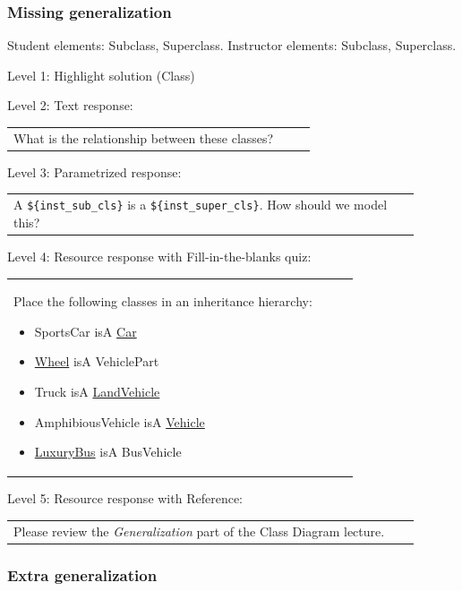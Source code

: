 \subsubsection{Missing generalization}

Student elements: Subclass, Superclass. Instructor elements: Subclass, Superclass. \medskip

\noindent Level 1: Highlight solution (Class) \medskip

\noindent Level 2: Text response: \medskip

\begin{tabular}{|p{0.9\linewidth}}
What is the relationship between these classes?
\end{tabular} \medskip

\noindent Level 3: Parametrized response: \medskip

\begin{tabular}{|p{0.9\linewidth}}
A \verb|${inst_sub_cls}| is a \verb|${inst_super_cls}|. How should we model this?
\end{tabular} \medskip

\noindent Level 4: Resource response with Fill-in-the-blanks quiz: \medskip

\begin{tabular}{|p{0.9\linewidth}}

Place the following classes in an inheritance hierarchy:

\begin{itemize}
    \item SportsCar isA \underline{Car}
    \item \underline{Wheel} isA VehiclePart
    \item Truck isA \underline{LandVehicle}
    \item AmphibiousVehicle isA \underline{Vehicle}
    \item \underline{LuxuryBus} isA BusVehicle
\end{itemize}

\end{tabular} \medskip

\noindent Level 5: Resource response with Reference: \medskip

\begin{tabular}{|p{0.9\linewidth}}
Please review the \textit{Generalization} part of the Class Diagram lecture.
\end{tabular} \medskip


\subsubsection{Extra generalization}


